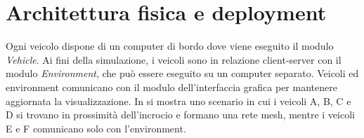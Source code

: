 \documentclass{memoir}
\begin{document}
\section{Architettura fisica e deployment}

Ogni veicolo dispone di un computer di bordo dove viene eseguito il modulo
\emph{Vehicle}. Ai fini della simulazione, i veicoli sono in relazione
client-server con il modulo \emph{Environment}, che può essere eseguito su un
computer separato. Veicoli ed environment comunicano con il modulo
dell'interfaccia grafica per mantenere aggiornata la visualizzazione. In
 si mostra uno scenario in cui i veicoli A, B, C e D si trovano
in prossimità dell'incrocio e formano una rete mesh, mentre i veicoli E e F
comunicano solo con l'environment. 

\end{document}
